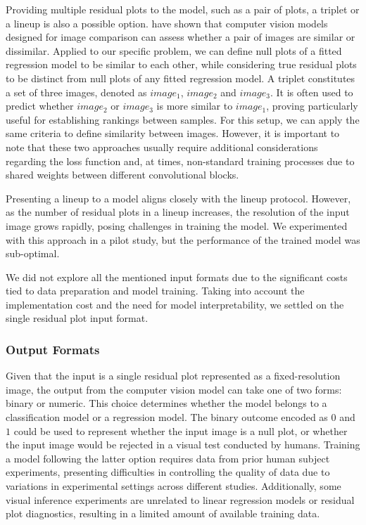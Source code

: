 \documentclass[]{interact}
\theoremstyle{plain}%
\theoremstyle{definition}
\theoremstyle{remark}
\begin{document}
Providing multiple residual plots to the model, such as a pair of plots,
a triplet or a lineup is also a possible option.
\citet{chopra2005learning} have shown that computer vision models
designed for image comparison can assess whether a pair of images are
similar or dissimilar. Applied to our specific problem, we can define
null plots of a fitted regression model to be similar to each other,
while considering true residual plots to be distinct from null plots of
any fitted regression model. A triplet constitutes a set of three
images, denoted as \(image_1\), \(image_2\) and \(image_3\). It is often
used to predict whether \(image_2\) or \(image_3\) is more similar to
\(image_1\), proving particularly useful for establishing rankings
between samples. For this setup, we can apply the same criteria to
define similarity between images. However, it is important to note that
these two approaches usually require additional considerations regarding
the loss function and, at times, non-standard training processes due to
shared weights between different convolutional blocks.

Presenting a lineup to a model aligns closely with the lineup protocol.
However, as the number of residual plots in a lineup increases, the
resolution of the input image grows rapidly, posing challenges in
training the model. We experimented with this approach in a pilot study,
but the performance of the trained model was sub-optimal.

We did not explore all the mentioned input formats due to the
significant costs tied to data preparation and model training. Taking
into account the implementation cost and the need for model
interpretability, we settled on the single residual plot input format.

\subsubsection{Output Formats}\label{output-formats}

Given that the input is a single residual plot represented as a
fixed-resolution image, the output from the computer vision model can
take one of two forms: binary or numeric. This choice determines whether
the model belongs to a classification model or a regression model. The
binary outcome encoded as \(0\) and \(1\) could be used to represent
whether the input image is a null plot, or whether the input image would
be rejected in a visual test conducted by humans. Training a model
following the latter option requires data from prior human subject
experiments, presenting difficulties in controlling the quality of data
due to variations in experimental settings across different studies.
Additionally, some visual inference experiments are unrelated to linear
regression models or residual plot diagnostics, resulting in a limited
amount of available training data.
\end{document}
